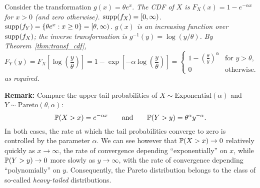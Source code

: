 \begin{solution}
Consider the transformation $g(x) = \theta e^x$.
\bit
\it The CDF of $X$ is $F_X(x) = 1 - e^{-\alpha x}$ for $x>0$ (and zero otherwise).
\it $\text{supp}(f_X) = [0,\infty)$.
\it $\text{supp}(f_Y) = \{\theta e^x: x\geq 0\} = [\theta,\infty)$.
\it $g(x)$ is an increasing function over $\text{supp}(f_X)$;
\it the inverse transformation is $g^{-1}(y) = \log(y/\theta)$.
\eit
By Theorem~\ref{thm:transf_cdf},
\[
F_Y(y)
	= F_X\left[\log \left(\frac{y}{\theta}\right)\right]
	= 1 - \exp\left[-\alpha\log \left(\frac{y}{\theta}\right)\right]
	= \begin{cases}
		1 - \displaystyle\left(\frac{\theta}{y}\right)^{\alpha}	& \text{for } y > \theta, \\[2ex]
		0					& \text{otherwise.}
	\end{cases}	
\]
as required.

\bigskip\textbf{Remark:}
Compare the upper-tail probabilities of $X\sim\text{Exponential}(\alpha)$ and $Y\sim\text{Pareto}(\theta,\alpha)$:
\[
\mathbb{P}(X > x) = e^{-\alpha x}
\qquad\text{and}\qquad
\mathbb{P}(Y > y) = \theta^{\alpha} y^{-\alpha}.
\]
In both cases, the rate at which the tail probabilities converge to zero is controlled by the parameter $\alpha$. We can see however that $\mathbb{P}(X>x)\to 0$ relatively quickly as $x\to\infty$, the rate of convergence depending ``exponentially'' on $x$, while $\mathbb{P}(Y>y)\to 0$ more slowly as $y\to\infty$, with the rate of convergence depending ``polynomially'' on $y$.
Consequently, the Pareto distribution belongs to the class of so-called \emph{heavy-tailed} distributions.
\end{solution}


